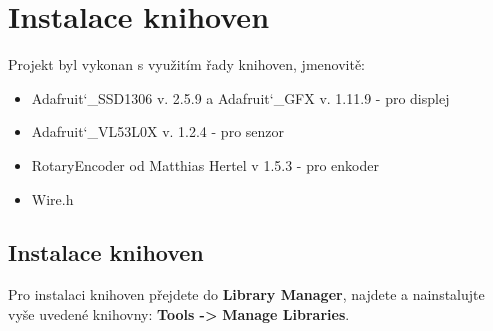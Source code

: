 \graphicspath{{Images/}}
\hypersetup{linkcolor=blue, urlcolor=blue}

\section{Instalace knihoven}
\begin{spacing}{1.5}
    \fontsize{14}{14}\selectfont
    Projekt byl vykonan s využitím řady knihoven, jmenovitě:
    \begin{itemize}
    \item {Adafruit\char`_SSD1306 v. 2.5.9 a Adafruit\char`_GFX v. 1.11.9}  - pro displej
    \item {Adafruit\char`_VL53L0X v. 1.2.4} - pro senzor
    \item {RotaryEncoder} od Matthias Hertel v 1.5.3 - pro enkoder
    \item {Wire.h}
    \end{itemize}
    \subsection{Instalace knihoven}
    \fontsize{14}{14}\selectfont
    Pro instalaci knihoven přejdete do \textbf{Library Manager}, najdete a nainstalujte vyše uvedené knihovny: \textbf{Tools ->} \textbf{Manage Libraries}.

\end{spacing}